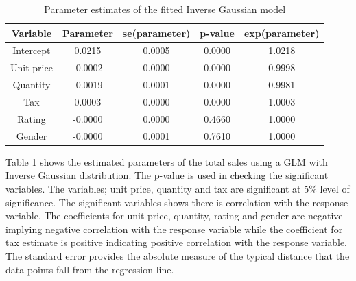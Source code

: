 \begin{table}[H]
	\centering
	\caption{Parameter estimates of the fitted Inverse Gaussian model}
	\begin{tabular}{ccccc}
		\hline
		Variable   & Parameter  & se(parameter) & p-value & exp(parameter) \\ \hline
		Intercept  & 0.0215 & 0.0005     & 0.0000  & 1.0218         \\
		Unit price & -0.0002 & 0.0000     & 0.0000  & 0.9998         \\
		Quantity   & -0.0019 & 0.0001     & 0.0000  & 0.9981         \\
		Tax        & 0.0003 & 0.0000     & 0.0000  & 1.0003         \\
		Rating     & -0.0000 & 0.0000     & 0.4660  & 1.0000         \\
		Gender     & -0.0000 & 0.0001     & 0.7610  & 1.0000         \\ \hline
	\end{tabular}
\label{table:inverse}
\end{table}
Table \ref{table:inverse} shows the estimated parameters of the total sales using a GLM with Inverse Gaussian distribution. The p-value is used in checking the significant variables. The variables; unit price, quantity and tax are significant at 5\% level of significance. The significant variables shows there is correlation  with the response variable. The coefficients for unit price, quantity, rating and gender are negative implying negative correlation with the response variable while the coefficient for tax estimate is positive indicating positive correlation with the response variable. The standard error provides the absolute measure of the typical distance that the data points fall from the regression line. 

